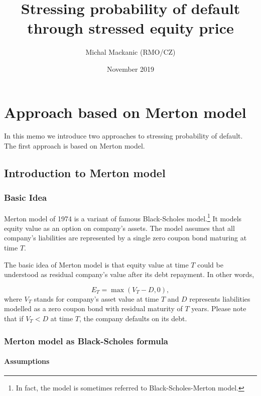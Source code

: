 \documentclass[a4paper]{book}
\begin{document}
\title{Stressing probability of default through stressed equity price}
\author{Michal Mackanic (RMO/CZ)}
\date{November 2019}
\maketitle

\tableofcontents{}

\chapter{Approach based on Merton model}

In this memo we introduce two approaches to stressing probability of default. The first approach is based on Merton model.

\section{Introduction to Merton model}

\subsection{Basic Idea}

Merton model of 1974 is a variant of famous Black-Scholes model.\footnote{In fact, the model is sometimes referred to Black-Scholes-Merton model.} It models equity value as an option on company's assets. The model assumes that all company's liabilities are represented by a single zero coupon bond maturing at time $T$.

The basic idea of Merton model is that equity value at time $T$ could be understood as residual company's value after its debt repayment. In other words,

\begin{equation}
E_T = \max(V_T - D, 0),
\end{equation}
where $V_T$ stands for company's asset value at time $T$ and $D$ represents liabilities modelled as a zero coupon bond with residual maturity of $T$ years. Please note that if $V_T < D$ at time $T$, the company defaults on its debt.

\subsection{Merton model as Black-Scholes formula}

\subsubsection{Assumptions}
\end{document}
